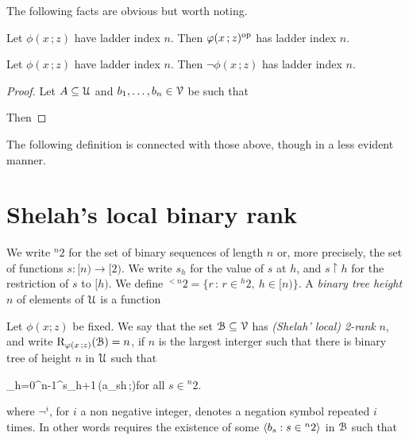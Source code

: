 \documentclass[scombinatorics.tex]{subfiles}
\begin{document}
The following facts are obvious but worth noting.

\begin{fact}\label{fact_stability_dual}
  Let $\phi(x\,;z)$ have ladder index $n$. 
  Then $\phi(x\,;z)^{\rm op}$ has ladder index $n$.\QED
\end{fact}
 
\begin{fact}\label{fact_stability_neg}
  Let $\phi(x\,;z)$ have ladder index $n$. 
  Then $\neg\phi(x\,;z)$ has ladder index $n$.\QED
\end{fact}

\begin{proof} Let $A\subseteq\U$ and $b_1,\dots,b_n\in\V$  be such that


  Then
  
\end{proof}
 
The following definition is connected with those above, though in a less evident manner.



\section{Shelah's local binary rank}
We write ${}^n2$ for the set of binary sequences of length $n$ or, more precisely, the set of functions $s:[n)\to[2)$.
We write $s_h$ for the value of $s$ at $h$, and $s{\restriction} h$ for the restriction of $s$ to $[h)$.
We define ${}^{<n}2=\big\{r\, :\, r\in {}^h2,\ h\in[n)\big\}$.
A \emph{binary tree height $n$\/} of elements of $\U$ is a function 

\nopagebreak[4]\par
{}

Let $\phi(x;z)$ be fixed. 
We say that the set $\B\subseteq\V$ has \emph{(Shelah' local) 2-rank\/} $n$, and write ${\rm R}_{\phi(x\,;z)}(\B)=n$, if $n$ is the largest interger such that there is binary tree of height $n$ in $\U$ such that 

{\neq}
{\bigcap_{h=0}^{n-1}\neg^{s_h+1}\,\phi(a_{s\restriction h}\,;\B)}\hfill for all $s\in {}^n2$.

where $\neg^i$, for $i$ a non negative integer, denotes a negation symbol repeated $i$ times.
In other words  requires the existence of some $\<b_s:s\in{}^n2\>$ in $\B$ such that
\end{document}
